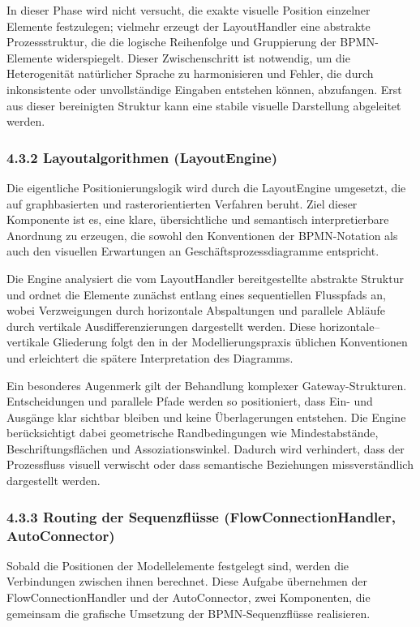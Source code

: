 \documentclass[a4paper,12pt]{scrreprt}
\begin{document}
In dieser Phase wird nicht versucht, die exakte visuelle Position einzelner Elemente festzulegen; vielmehr erzeugt der LayoutHandler eine abstrakte Prozessstruktur, die die logische Reihenfolge und Gruppierung der BPMN-Elemente widerspiegelt. Dieser Zwischenschritt ist notwendig, um die Heterogenität natürlicher Sprache zu harmonisieren und Fehler, die durch inkonsistente oder unvollständige Eingaben entstehen können, abzufangen. Erst aus dieser bereinigten Struktur kann eine stabile visuelle Darstellung abgeleitet werden.

\subsubsection*{4.3.2 Layoutalgorithmen (LayoutEngine)}

Die eigentliche Positionierungslogik wird durch die LayoutEngine umgesetzt, die auf graphbasierten und rasterorientierten Verfahren beruht. Ziel dieser Komponente ist es, eine klare, übersichtliche und semantisch interpretierbare Anordnung zu erzeugen, die sowohl den Konventionen der BPMN-Notation als auch den visuellen Erwartungen an Geschäftsprozessdiagramme entspricht.

Die Engine analysiert die vom LayoutHandler bereitgestellte abstrakte Struktur und ordnet die Elemente zunächst entlang eines sequentiellen Flusspfads an, wobei Verzweigungen durch horizontale Abspaltungen und parallele Abläufe durch vertikale Ausdifferenzierungen dargestellt werden. Diese horizontale–vertikale Gliederung folgt den in der Modellierungspraxis üblichen Konventionen und erleichtert die spätere Interpretation des Diagramms.

Ein besonderes Augenmerk gilt der Behandlung komplexer Gateway-Strukturen. Entscheidungen und parallele Pfade werden so positioniert, dass Ein- und Ausgänge klar sichtbar bleiben und keine Überlagerungen entstehen. Die Engine 
berücksichtigt dabei geometrische Randbedingungen wie Mindestabstände, Beschriftungsflächen und Assoziationswinkel. Dadurch wird verhindert, dass der Prozessfluss visuell verwischt oder dass semantische Beziehungen  missverständlich dargestellt werden.

\subsubsection*{4.3.3 Routing der Sequenzflüsse (FlowConnectionHandler, AutoConnector)}

Sobald die Positionen der Modellelemente festgelegt sind, werden die Verbindungen zwischen ihnen berechnet. Diese Aufgabe übernehmen der FlowConnectionHandler und der AutoConnector, zwei Komponenten, die gemeinsam die grafische Umsetzung der BPMN-Sequenzflüsse realisieren.
\end{document}
